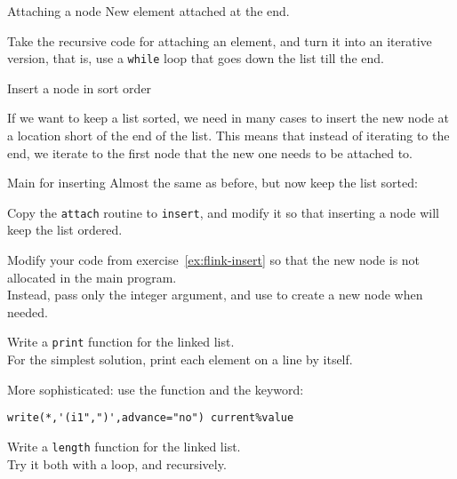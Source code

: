 \begin{block}{Attaching a node}
  \label{sl:flink-attach}
  New element attached at the end.
\end{block}

\begin{exercise}
  \label{ex:flist-attach-while}
  Take the recursive code for attaching an element,
  and turn it into an iterative version,
  that is, use a \lstinline{while} loop
  that goes down the list till the end.
\end{exercise}


 {Insert a node in sort order}

If we want to keep a list sorted, we need in many cases
to insert the new node at a location short of the end of the list.
This means that instead of iterating to the end,
we iterate to the first node that the new one needs to be attached to.

\begin{block}{Main for inserting}
  \label{sl:flink-insert-main}
  Almost the same as before,
  but now keep the list sorted:
\end{block}

\begin{exercise}
  \label{ex:flink-insert}
  Copy the \lstinline{attach} routine to \lstinline{insert},
  and modify it so that inserting a node will keep the list ordered.

\end{exercise}

\begin{exercise}
  \label{ex:flink-insert-alloc}
  Modify your code from exercise~\ref{ex:flink-insert}
  so that the new node is not allocated in the main program.\\
  Instead, pass only the integer argument,
  and use  to create a new node when needed.
\end{exercise}

\begin{exercise}
  \label{ex:flist-print}
  Write a \lstinline{print} function for the linked list.\\
  For the simplest solution, print each element on a line by itself.

  More sophisticated: use the  function and the
   keyword:
\begin{lstlisting}
write(*,'(i1",")',advance="no") current%value  
\end{lstlisting}
\end{exercise}

\begin{exercise}
  \label{ex:flist-length}
  Write a \lstinline{length} function for the linked list.\\
  Try it both with a loop, and recursively.
\end{exercise}


